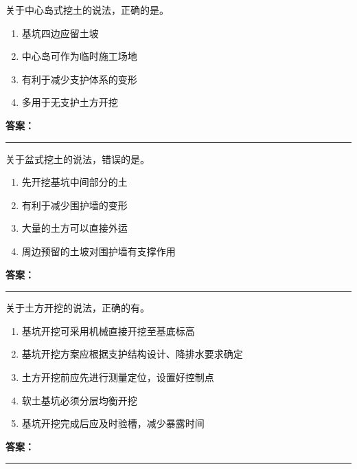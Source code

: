 \documentclass[UTF8,fontset=fandol,11pt]{ctexart}
\newcommand{\answerline}{\textcolor{answerred}{\rule{2.4cm}{0.7pt}}}
\begin{document}
\vspace{0.2em}

\begin{quizbox}[title={第 12 题}]
关于中心岛式挖土的说法，正确的是。\\
\begin{enumerate}[label=\Alph*.]
\item 基坑四边应留土坡
\item 中心岛可作为临时施工场地
\item 有利于减少支护体系的变形
\item 多用于无支护土方开挖
\end{enumerate}
\textbf{\textcolor{answerred}{答案：}} \answerline
\end{quizbox}

\vspace{0.2em}

\begin{quizbox}[title={第 13 题}]
关于盆式挖土的说法，错误的是。\\
\begin{enumerate}[label=\Alph*.]
\item 先开挖基坑中间部分的土
\item 有利于减少围护墙的变形
\item 大量的土方可以直接外运
\item 周边预留的土坡对围护墙有支撑作用
\end{enumerate}
\textbf{\textcolor{answerred}{答案：}} \answerline
\end{quizbox}

\vspace{0.2em}

\begin{quizbox}[title={第 14 题}]
关于土方开挖的说法，正确的有。\\
\begin{enumerate}[label=\Alph*.]
\item 基坑开挖可采用机械直接开挖至基底标高
\item 基坑开挖方案应根据支护结构设计、降排水要求确定
\item 土方开挖前应先进行测量定位，设置好控制点
\item 软土基坑必须分层均衡开挖
\item 基坑开挖完成后应及时验槽，减少暴露时间
\end{enumerate}
\textbf{\textcolor{answerred}{答案：}} \answerline
\end{quizbox}

\vspace{0.2em}
\end{document}

